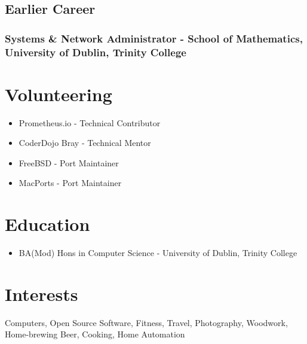 \documentclass[a4paper, 10pt] {article}
\begin{document}
\subsection*{Earlier Career}

\subsubsection*{Systems \& Network Administrator - School of Mathematics, University of Dublin, Trinity College}

\section*{Volunteering}

\begin{itemize}[noitemsep]
  \item Prometheus.io - Technical Contributor
  \item CoderDojo Bray - Technical Mentor
  \item FreeBSD - Port Maintainer
  \item MacPorts - Port Maintainer
\end{itemize}

\section*{Education}

\begin{itemize}
  \item BA(Mod) Hons in Computer Science - University of Dublin, Trinity College
\end{itemize}

\section*{Interests}

Computers, Open Source Software, Fitness, Travel, Photography, Woodwork,
Home-brewing Beer, Cooking, Home Automation
\end{document}
